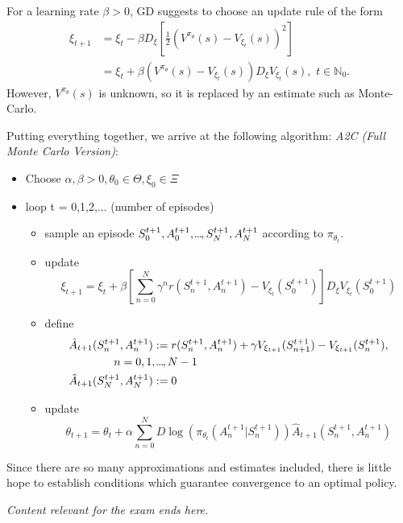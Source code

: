  For a learning rate \( \beta > 0  \), GD suggests to choose an update rule of the form
 \begin{align*}
     \xi_{t+1} &= \xi_{t} - \beta D_{\xi} \left[ \frac{1}{2}(V^{\pi_\theta}(s) - V_{\xi_t}(s))^2 \right] \\
     &= \xi_t + \beta (V^{\pi_\theta}(s) - V_{\xi_t}(s)) D_\xi V_{\xi_{t}}(s), \,\, t \in \mathbb{N}_{0}.
 \end{align*}
 However, \( V^{\pi_\theta}(s) \) is unknown, so it is replaced by an estimate such as Monte-Carlo.



 Putting everything together, we arrive at the following algorithm: \emph{A2C (Full Monte Carlo Version)}:
 \begin{itemize}
     \item Choose \( \alpha, \beta > 0, \theta_{0} \in \Theta, \xi_{0} \in \Xi\)
     \item loop t = 0,1,2,... (number of episodes)
     \begin{itemize}
         \item sample an episode \( S_{0}^{t+1}, A_{0}^{t+1},\kern-0.10em.\kern-0.06em.\kern-0.06em.\kern-0.1em,S_N^{t+1}, A_N^{t+1} \) according to \( \pi_{\theta_t} \).
         \item update 
         \[
             \xi_{t+1} = \xi_t + \beta \left[ \sum_{n=0}^N \gamma^n r(S_n^{t+1}, A_n^{t+1}) - V_{\xi_t}(S_{0}^{t+1}) \right] D_\xi V_{\xi_t}(S_{0}^{t+1})
         \]  
         \item define 
         \begin{align*}
             &\hat{A}_{t+1}(S_n^{t+1}, A_n^{t+1}) := r(S_n^{t+1}, A_n^{t+1}) + \gamma V_{\xi_{t + 1}}(S_{n+1}^{t+1}) - V_{\xi_{t+1}}(S_n^{t+1}),\\
             & \qquad \qquad n= 0,1,\kern-0.10em.\kern-0.06em.\kern-0.06em.\kern-0.1em,N-1\\
             &\hat{A}_{t+1}(S_N^{t+1}, A_N^{t+1}) := 0
         \end{align*}
         \item update 
         \[
             \theta_{t+1} = \theta_{t} + \alpha \sum_{ n = 0}^N D \log(\pi_{\theta_t}(A_{n}^{t+1} | S_n^{t+1} )) \hat{A}_{t+1}(S_n^{t+1}, A_n^{t+1})
         \]
     \end{itemize} 
 \end{itemize}

Since there are so many approximations and estimates included, there is little hope to establish conditions which guarantee convergence to an optimal policy.

\begin{center}
    \emph{Content relevant for the exam ends here.}
\end{center}
